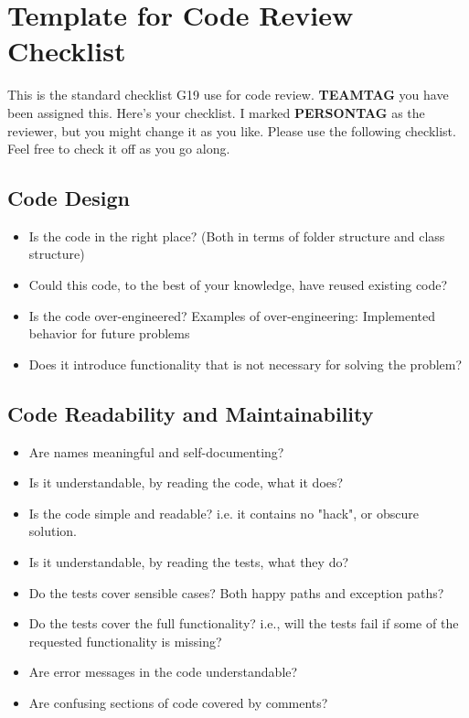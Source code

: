 \chapter{Template for Code Review Checklist} \label{app:code-review-checklist}
This is the standard checklist \gls{G19} use for code review.
\textbf{TEAMTAG} you have been assigned this. Here's your checklist. I
marked \textbf{PERSONTAG} as the reviewer, but you might change it as you
like. Please use the following checklist. Feel free to check it off as
you go along.

\section{Code Design}
\begin{itemize}
\item Is the code in the right place? (Both in terms of folder
 structure and class structure)
\item Could this code, to the best of your knowledge, have reused
 existing code?
\item Is the code over-engineered? Examples of over-engineering:
 Implemented behavior for future problems
\item Does it introduce functionality that is not necessary for
 solving the problem?
\end{itemize}

\section{Code Readability and Maintainability}
\begin{itemize}
\item Are names meaningful and self-documenting?
\item Is it understandable, by reading the code, what it does?
\item Is the code simple and readable? i.e. it contains no "hack",
 or obscure solution.
\item Is it understandable, by reading the tests, what they do?
\item Do the tests cover sensible cases? Both happy paths and
 exception paths?
\item Do the tests cover the full functionality? i.e., will the
 tests fail if some of the requested functionality is missing?
\item Are error messages in the code understandable?
\item Are confusing sections of code covered by comments?
\end{itemize}

